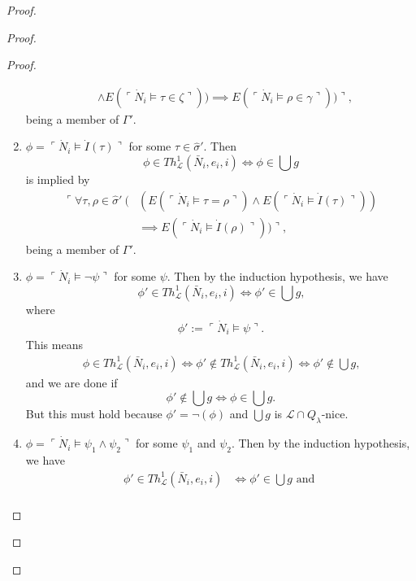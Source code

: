 \documentclass[12pt]{article}
\numberwithin{equation}{section}
\begin{document}
\begin{proof}
\begin{proof}
\begin{proof}
\begin{enumerate}[label=Case \arabic*:, leftmargin=50pt]
\begin{align*}
        & \wedge E(\ulcorner \dot{N}_i \models \tau \in \zeta \urcorner)) \implies E(\ulcorner \dot{N}_i \models \rho \in \gamma \urcorner)) \urcorner,
    \end{align*}
    being a member of $\Gamma'$.
    \item $\phi = \ulcorner \dot{N}_i \models \dot{I}(\tau) \urcorner$ for some $\tau \in \hat{\sigma}'$. Then 
    \begin{equation*}
        \phi \in Th^{1}_{\mathcal{L}}(\bar{N}_i, e_i, i) \iff \phi \in \bigcup g
    \end{equation*}
    is implied by  
    \begin{align*}
        \ulcorner \forall \tau, \rho \in \hat{\sigma}' \ ( & (E(\ulcorner \dot{N}_i \models \tau = \rho \urcorner) \wedge E(\ulcorner \dot{N}_i \models \dot{I}(\tau) \urcorner)) \\
        & \implies E(\ulcorner \dot{N}_i \models \dot{I}(\rho) \urcorner)) \urcorner,
    \end{align*}
    being a member of $\Gamma'$.
    \item $\phi = \ulcorner \dot{N}_i \models \neg \psi \urcorner$ for some $\psi$. Then by the induction hypothesis, we have \begin{equation*}
        \phi' \in Th^{1}_{\mathcal{L}}(\bar{N}_i, e_i, i) \iff \phi' \in \bigcup g \text{,} 
    \end{equation*}
    where
    \begin{align*}
        \phi' := \ulcorner \dot{N}_i \models \psi \urcorner \text{.} 
    \end{align*}
    This means  
    \begin{align*}
        \phi \in Th^{1}_{\mathcal{L}}(\bar{N}_i, e_i, i) \iff \phi' \not \in Th^{1}_{\mathcal{L}}(\bar{N}_i, e_i, i) \iff \phi' \not \in \bigcup g \text{,}
    \end{align*}
    and we are done if 
    \begin{equation*}
        \phi' \not \in \bigcup g \iff \phi \in \bigcup g \text{.}
    \end{equation*}
    But this must hold because $\phi' = \neg(\phi)$ and $\bigcup g$ is $\mathcal{L} \cap Q_{\lambda}$-nice. 
    \item $\phi = \ulcorner \dot{N}_i \models \psi_1 \wedge \psi_2 \urcorner$ for some $\psi_1$ and $\psi_2$. Then by the induction hypothesis, we have 
    \begin{align*}
        \phi' \in Th^{1}_{\mathcal{L}}(\bar{N}_i, e_i, i) & \iff \phi' \in \bigcup g \text{ and } \\

\end{align*}
\end{enumerate}
\end{proof}
\end{proof}
\end{proof}
\end{document}
